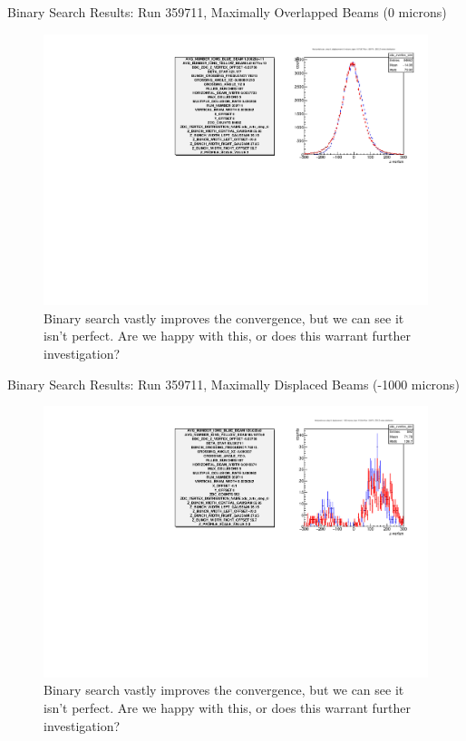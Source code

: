 \begin{frame}{ Binary Search Results: Run 359711, Maximally Overlapped Beams (0 microns)}
\begin{figure}
\begin{center}
\includegraphics[width=\linewidth]{../RootFinding/figs/359711_max_overlap_binary_search.pdf}
\end{center}
\caption{Binary search vastly improves the convergence, but we can see it isn't
perfect. Are we happy with this, or does this warrant further investigation?}
\label{fig:359711_max_overlap_binary_search}
\end{figure}
\end{frame}

\begin{frame}{ Binary Search Results: Run 359711, Maximally Displaced Beams (-1000 microns) }
\begin{figure}
\begin{center}
\includegraphics[width=\linewidth]{../RootFinding/figs/359711_min_overlap_binary_search.pdf}
\end{center}
\caption{Binary search vastly improves the convergence, but we can see it isn't
perfect. Are we happy with this, or does this warrant further investigation?}
\label{fig:359711_min_overlap_binary_search}
\end{figure}
\end{frame}
